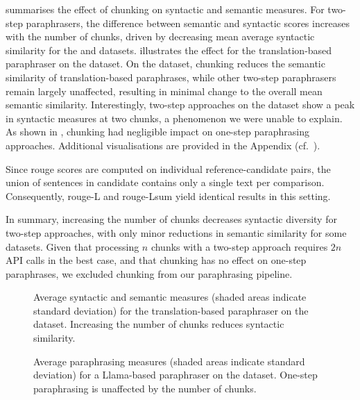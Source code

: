 summarises the effect of chunking on syntactic and semantic measures. 
For two-step paraphrasers, the difference between semantic and syntactic scores increases with the number of chunks, driven by decreasing mean average syntactic similarity for the \dataBlog{} and \dataStudent{} datasets. 
 illustrates the effect for the translation-based paraphraser on the \dataBlog{} dataset. 
On the \dataGutenberg{} dataset, chunking reduces the semantic similarity of translation-based paraphrases, while other two-step paraphrasers remain largely unaffected, resulting in minimal change to the overall mean semantic similarity. 
Interestingly, two-step approaches on the \dataPan{} dataset show a peak in syntactic measures at two chunks, a phenomenon we were unable to explain. 
As shown in , chunking had negligible impact on one-step paraphrasing approaches. 
Additional visualisations are provided in the Appendix (cf.~).

Since \ac{rouge} scores are computed on individual reference-candidate pairs, the union of sentences in candidate contains only a single text per comparison. 
Consequently, \ac{rouge}-L and \ac{rouge}-Lsum yield identical results in this setting.

In summary, increasing the number of chunks decreases syntactic diversity for two-step approaches, with only minor reductions in semantic similarity for some datasets. 
Given that processing $n$ chunks with a two-step approach requires $2n$ API calls in the best case, and that chunking has no effect on one-step paraphrases, we excluded chunking from our paraphrasing pipeline.

\begin{figure}[htbp]
    \centering
    
    \caption[Impact of the number of chunks on \dataBlog{} dataset.]{
    Average syntactic and semantic measures (shaded areas indicate standard deviation) for the translation-based paraphraser on the \dataBlog{} dataset. 
    Increasing the number of chunks reduces syntactic similarity.    
    }
    \label{fig:abl_chunks_blog_translation}
\end{figure}

\begin{figure}[htbp]
    \centering
    
    \caption[Impact of the number of chunks on \dataStudent{} dataset.]{Average paraphrasing measures (shaded areas indicate standard deviation) for a Llama-based paraphraser on the \dataStudent{} dataset. 
    One-step paraphrasing is unaffected by the number of chunks.
    }
    \label{fig:abl_chunks_student_essays_llama}
\end{figure}